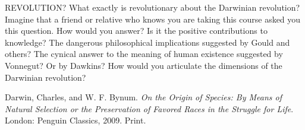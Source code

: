 \documentclass[11pt, oneside]{article}
\title{}
\author{Abhi Agarwal (abhia@nyu.edu)}
\date{}
\begin{document}
\maketitle

\par REVOLUTION? What exactly is revolutionary about the Darwinian revolution? Imagine that a friend
or relative who knows you are taking this course asked you this question. How would you answer? Is
it the positive contributions to knowledge? The dangerous philosophical implications suggested by
Gould and others? The cynical answer to the meaning of human existence suggested by Vonnegut?
Or by Dawkins? How would you articulate the dimensions of the Darwinian revolution?

\begin{thebibliography}{9}
  Darwin, Charles, and W. F. Bynum.
  \emph{On the Origin of Species: By Means of Natural Selection or the Preservation of Favored Races in the Struggle for Life}.
  London: Penguin Classics, 2009.
  Print.
\end{thebibliography}
\end{document}
